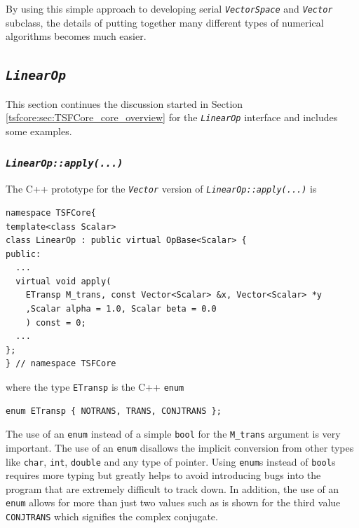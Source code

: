 By using this simple approach to developing serial
\texttt{\textit{VectorSpace}} and \texttt{\textit{Vector}} subclass,
the details of putting together many different types of numerical
algorithms becomes much easier.

%
\subsection{\texttt{\textit{LinearOp}}}
\label{tsfcore:sec:linear_op}
%

This section continues the discussion started in Section
\ref{tsfcore:sec:TSFCore_core_overview} for the
\texttt{\textit{LinearOp}} interface and includes some examples.

%
\subsubsection{\texttt{\textit{LinearOp::apply(\-...)}}}
\label{tsfcore:sec:linear_op_apply}
%

The C++ prototype for the \texttt{\textit{Vector}} version of
\texttt{\textit{LinearOp\-::apply(\-...)}} is

{\scriptsize\begin{verbatim}
namespace TSFCore{
template<class Scalar>
class LinearOp : public virtual OpBase<Scalar> {
public:
  ...
  virtual void apply(
    ETransp M_trans, const Vector<Scalar> &x, Vector<Scalar> *y
    ,Scalar alpha = 1.0, Scalar beta = 0.0
    ) const = 0;
  ...
};
} // namespace TSFCore
\end{verbatim}}

{}\noindent{}where the type \texttt{ETransp} is the C++ \texttt{enum}

{\scriptsize\begin{verbatim}
enum ETransp { NOTRANS, TRANS, CONJTRANS };
\end{verbatim}}

{}\noindent{}The use of an \texttt{enum} instead of a simple \texttt{bool} for the
\texttt{M\_trans} argument is very important.  The use of an \texttt{enum}
disallows the implicit conversion from other types like \texttt{char},
\texttt{int}, \texttt{double} and any type of pointer.  Using
\texttt{enum}s instead of \texttt{bool}s requires more typing but
greatly helps to avoid introducing bugs into the program that are
extremely difficult to track down.  In addition, the use of an
\texttt{enum} allows for more than just two values such as is shown
for the third value \texttt{CONJTRANS} which signifies the complex
conjugate.

